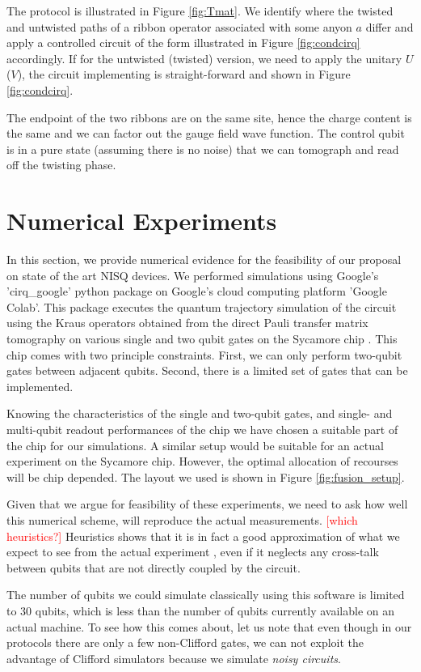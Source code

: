 \documentclass[two column]{article}
\newcommand{\caro}[1]{\textcolor{red}{[#1]}}
\begin{document}
The protocol is illustrated in Figure \ref{fig:Tmat}. We identify where the twisted and untwisted paths of a ribbon operator associated with some anyon $a$ differ and apply a controlled circuit of the form illustrated in Figure \ref{fig:condcirq} accordingly. If for the untwisted (twisted) version, we need to apply the unitary $U$ ($V$), the circuit implementing is straight-forward and shown in Figure \ref{fig:condcirq}.

The endpoint of the two ribbons are on the same site, hence the charge content is the same and we can factor out the gauge field wave function. 
The control qubit is in a pure state (assuming there is no noise) that we can tomograph and read off the twisting phase.


\section{Numerical Experiments}\label{sec:num}

In this section, we provide numerical evidence for the feasibility of our proposal on state of the art NISQ devices. We performed simulations using Google's 'cirq\_google' python package on Google's cloud computing platform 'Google Colab'. This package executes the quantum trajectory simulation of the circuit using the Kraus operators obtained from the direct Pauli transfer matrix tomography on various single and two qubit gates on the Sycamore chip \cite{weber}. This chip comes with two principle constraints. First, we can only perform two-qubit gates between adjacent qubits. Second, there is a limited set of gates that can be implemented. 


Knowing the characteristics of the single and two-qubit gates, and single- and multi-qubit readout performances of the chip \cite{weber} we have chosen a suitable part of the chip for our simulations. A similar setup would be suitable for an actual experiment on the Sycamore chip. However, the optimal allocation of recourses will be chip depended. The layout we used is shown in Figure \ref{fig:fusion_setup}.

Given that we argue for feasibility of these experiments, we need to ask how well this numerical scheme, will reproduce the actual measurements.
\caro{which heuristics?} Heuristics shows that it is in fact a good approximation of what we expect to see from the actual experiment \cite{}, even if it neglects any cross-talk between qubits that are not directly coupled by the circuit.

The number of qubits we could simulate classically using this software is limited to 30 qubits, which is less than the number of qubits currently available on an actual machine. To see how this comes about, let us note that even though in our protocols there are only a few non-Clifford gates, we can not exploit the advantage of Clifford simulators because we simulate \emph{noisy circuits}. 
\end{document}
